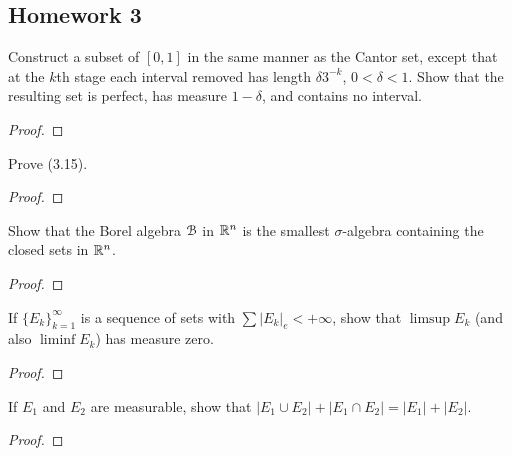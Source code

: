 \subsection{Homework 3}
\begin{problem}
Construct a subset of $[0,1]$ in the same manner as the Cantor set, except
that at the $k$th stage each interval removed has length $\delta 3^{-k}$,
$0<\delta<1$. Show that the resulting set is perfect, has measure
$1-\delta$, and contains no interval.
\end{problem}
\begin{proof}
\end{proof}

\begin{problem}
Prove (3.15).
\end{problem}
\begin{proof}
\end{proof}

\begin{problem}
Show that the Borel algebra $\mathcal{B}$ in $\mathbb{R}^n$ is the smallest
$\sigma$-algebra containing the closed sets in $\mathbb{R}^n$.
\end{problem}
\begin{proof}
\end{proof}

\begin{problem}
  If ${\{E_k\}}_{k=1}^\infty$ is a sequence of sets with
  $\sum|{E_k}|_e<+\infty$, show that $\limsup E_k$ (and also
  $\liminf E_k$) has measure zero.
\end{problem}
\begin{proof}
\end{proof}

\begin{problem}
If $E_1$ and $E_2$ are measurable, show that
$|E_1\cup E_2|+|E_1\cap E_2|=|E_1|+|E_2|$.
\end{problem}
\begin{proof}
\end{proof}

